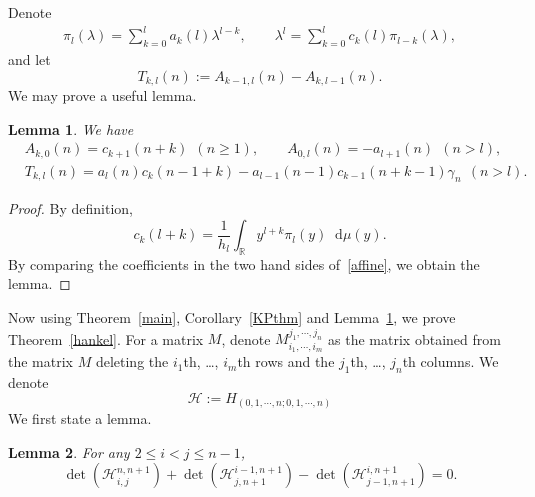 \documentclass[a4paper]{article}
\theoremstyle{plain}
\newtheorem{lem}{Lemma}
\theoremstyle{definition}
\newcommand{\dif}{\mathop{}\!\mathrm{d}}
\newcommand{\RR}{\mathbb{R}}
\begin{document}
Denote
\begin{align}\label{pi}
	\pi_l(\lambda)=\sum_{k=0}^la_k(l)\lambda^{l-k},\qquad\lambda^l=\sum_{k=0}^lc_k(l)\pi_{l-k}(\lambda),
\end{align} and let
\begin{equation}
	T_{k,l}(n):=A_{k-1,l}(n)-A_{k,l-1}(n).
\end{equation}
We may prove a useful lemma.
\begin{lem} \label{at}
	We have
	\begin{align}
		&A_{k,0}(n)=c_{k+1}(n+k)~~(n\ge1),\qquad A_{0,l}(n)=-a_{l+1}(n)~~(n>l), \label{0-case}\\
		&T_{k,l}(n)=a_l(n)c_k(n-1+k)-a_{l-1}(n-1)c_{k-1}(n+k-1)\gamma_n~~(n>l). \label{klcase}
	\end{align}
\end{lem}

\begin{proof}
	By definition,
	\begin{equation}
		c_k(l+k)=\frac{1}{h_l}\int_{\RR}y^{l+k}\pi_l(y)\dif\mu(y).
	\end{equation}
	By comparing the coefficients in the two hand sides of~\eqref{affine}, we obtain the lemma.
\end{proof}

Now using Theorem~\ref{main}, Corollary~\ref{KPthm} and Lemma~\ref{at}, we prove Theorem~\ref{hankel}. For a matrix $M$, denote $M_{i_1,\cdots,i_m}^{j_1,\cdots,j_n}$ as the matrix obtained from the matrix $M$ deleting the $i_1$th, \dots, $i_m$th rows and the $j_1$th, \dots, $j_n$th columns. We denote
\begin{equation}
	\mathcal H:=H_{(0,1,\cdots,n;0,1,\cdots,n)}
\end{equation} We first state a lemma.

\begin{lem} \label{det}
	For any $2\le i<j\le n-1$,
	\begin{equation}
		\det(\mathcal H_{i,j}^{n,n+1})+\det(\mathcal H_{j,n+1}^{i-1,n+1})-\det(\mathcal H_{j-1,n+1}^{i,n+1})=0.
	\end{equation}
\end{lem}
\end{document}
